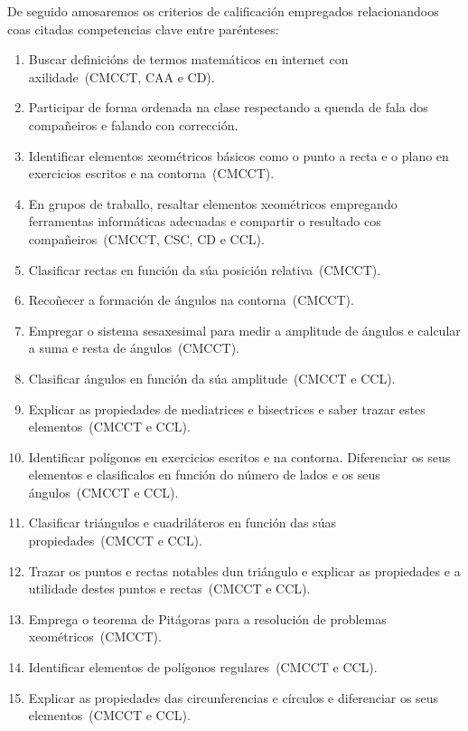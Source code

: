 De seguido amosaremos os criterios de calificación empregados relacionandoos coas citadas competencias clave entre parénteses:

\begin{enumerate}[label=\bfseries Cri\arabic*, align=left, leftmargin=1.5cm]
  \item\label{cri:definicions} Buscar definicións de termos matemáticos en internet con axilidade~(CMCCT, CAA e CD).
  \item\label{cri:interviraula} Participar de forma ordenada na clase respectando a quenda de fala dos compañeiros e falando con corrección.
  \item\label{cri:puntorecta} Identificar elementos xeométricos básicos como o punto a recta e o plano en exercicios escritos e na contorna~(CMCCT).
  \item\label{cri:resaltar} En grupos de traballo, resaltar elementos xeométricos empregando ferramentas informáticas adecuadas e compartir o resultado cos compañeiros~(CMCCT, CSC, CD e CCL).
  \item\label{cri:posrectas} Clasificar rectas en función da súa posición relativa~(CMCCT).
  \item\label{cri:angulos} Recoñecer a formación de ángulos na contorna~(CMCCT).
  \item\label{cri:sexasesimal} Empregar o sistema sesaxesimal para medir a amplitude de ángulos e calcular a suma e resta de ángulos~(CMCCT).
  \item\label{cri:clasangulos} Clasificar ángulos en función da súa amplitude~(CMCCT e CCL).
  \item\label{cri:mediatriz} Explicar as propiedades de mediatrices e bisectrices e saber trazar estes elementos~(CMCCT e CCL).
  \item\label{cri:poligonos} Identificar polígonos en exercicios escritos e na contorna. Diferenciar os seus elementos e clasificalos en función do número de lados e os seus ángulos~(CMCCT e CCL).
  \item\label{cri:claspoligonos} Clasificar triángulos e cuadriláteros en función das súas propiedades~(CMCCT e CCL).
  \item\label{cri:puntosnotables} Trazar os puntos e rectas notables dun triángulo e explicar as propiedades e a utilidade destes puntos e rectas~(CMCCT e CCL).
  \item\label{cri:pitagoras} Emprega o teorema de Pitágoras para a resolución de problemas xeométricos~(CMCCT).
  \item\label{cri:elementosregulares} Identificar elementos de polígonos regulares~(CMCCT e CCL).
  \item\label{cri:circunferencia} Explicar as propiedades das circunferencias e círculos e diferenciar os seus elementos~(CMCCT e CCL).
\end{enumerate}

